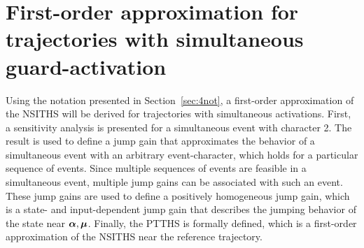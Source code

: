 \documentclass[../DC2017114Bouma.tex]{subfiles}
\begin{document}
\section{First-order approximation for trajectories with simultaneous guard-activation}
Using the notation presented in Section~\ref{sec:4not}, a first-order approximation of the NSITHS will be derived for trajectories with simultaneous activations. First, a sensitivity analysis is presented for a simultaneous event with character 2. The result is used to define a jump gain that approximates the behavior of a simultaneous event with an arbitrary event-character, which holds for a particular sequence of events. Since multiple sequences of events are feasible in a simultaneous event, multiple jump gains can be associated with such an event. These jump gains are used to define a positively homogeneous jump gain, which is a state- and input-dependent jump gain that describes the jumping behavior of the state near $\boldsymbol{\alpha},\boldsymbol{\mu}$. Finally, the PTTHS is formally defined, which is a first-order approximation of the NSITHS near the reference trajectory.
\end{document}
